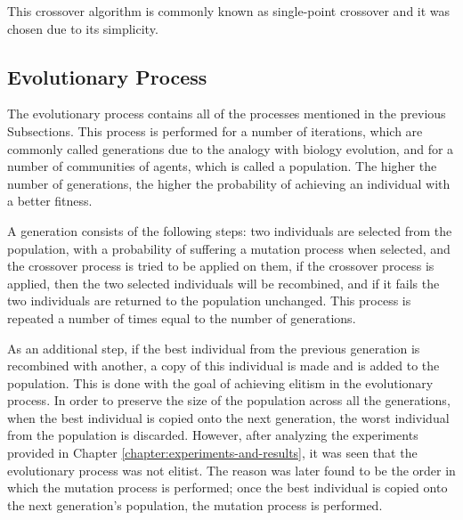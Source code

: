 This crossover algorithm is commonly known as single-point crossover and it was
chosen due to its simplicity.


\subsection{Evolutionary Process}
\label{subsection:evolutionary-process}

The evolutionary process contains all of the processes mentioned in the previous
Subsections. This process is performed for a number of iterations, which are
commonly called generations due to the analogy with biology evolution, and for a
number of communities of agents, which is called a population. The higher the
number of generations, the higher the probability of achieving an individual
with a better fitness.

A generation consists of the following steps: two individuals are selected from
the population, with a probability of suffering a mutation process when
selected, and the crossover process is tried to be applied on them, if the
crossover process is applied, then the two selected individuals will be
recombined, and if it fails the two individuals are returned to the population
unchanged. This process is repeated a number of times equal to the number of
generations.

As an additional step, if the best individual from the previous generation is
recombined with another, a copy of this individual is made and is added to the
population. This is done with the goal of achieving elitism in the evolutionary
process. In order to preserve the size of the population across all the
generations, when the best individual is copied onto the next generation, the
worst individual from the population is discarded. However, after analyzing the
experiments provided in Chapter \ref{chapter:experiments-and-results}, it was
seen that the evolutionary process was not elitist. The reason was later found
to be the order in which the mutation process is performed; once the best
individual is copied onto the next generation's population, the mutation process
is performed.
